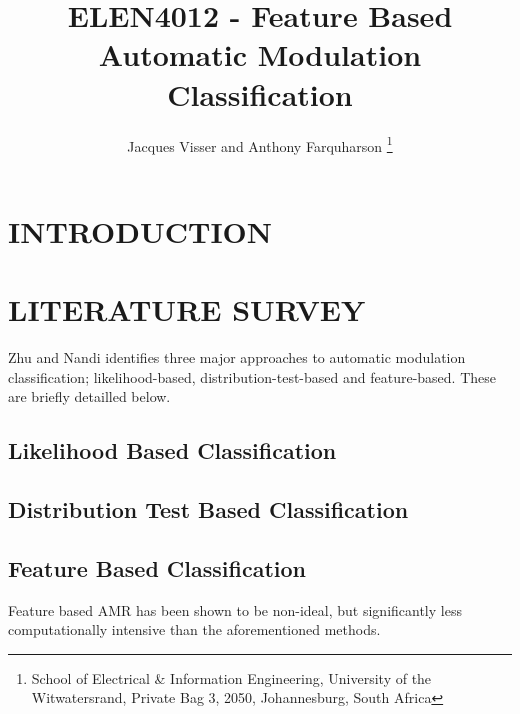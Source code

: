 \documentclass[10pt,twocolumn]{witseiepaper}
\begin{document}
\title{ELEN4012 - Feature Based Automatic Modulation Classification}

\author{Jacques Visser and Anthony Farquharson
\thanks{School of Electrical \& Information Engineering, University of the
Witwatersrand, Private Bag 3, 2050, Johannesburg, South Africa}
}



\maketitle
\thispagestyle{empty}\pagestyle{empty}

\section{INTRODUCTION}

\section{LITERATURE SURVEY}
Zhu and Nandi \cite{zhu2014automatic} identifies three major approaches to automatic modulation classification; likelihood-based, distribution-test-based and feature-based. These are briefly detailled below.
	\subsection{Likelihood Based Classification}
	\subsection{Distribution Test Based Classification}
	\subsection{Feature Based Classification}
	Feature based AMR has been shown to be non-ideal, but significantly less computationally intensive \cite{zhu2014automatic} than the aforementioned methods.
\end{document}
